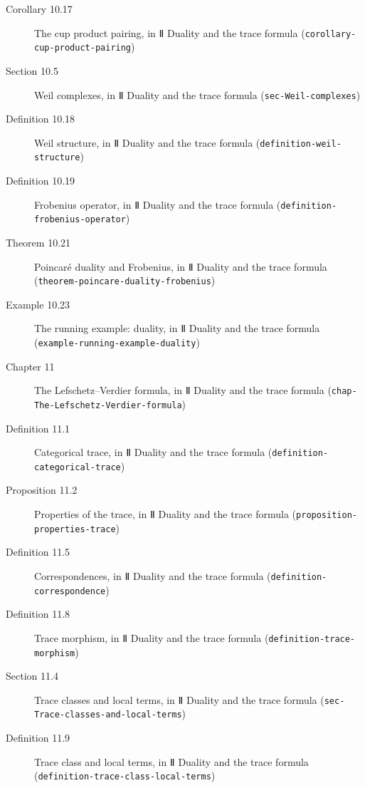 \documentclass[11pt]{article}
\newcommand{\bpslug}[1]{\texttt{#1}}
\begin{document}
\begin{description}
\item[Corollary 10.17] The cup product pairing, in Ⅱ Duality and the trace formula (\bpslug{corollary-{}\allowbreak{}cup-{}\allowbreak{}product-{}\allowbreak{}pairing})
\item[Section 10.5] Weil complexes, in Ⅱ Duality and the trace formula (\bpslug{sec-{}\allowbreak{}Weil-{}\allowbreak{}complexes})
\item[Definition 10.18] Weil structure, in Ⅱ Duality and the trace formula (\bpslug{definition-{}\allowbreak{}weil-{}\allowbreak{}structure})
\item[Definition 10.19] Frobenius operator, in Ⅱ Duality and the trace formula (\bpslug{definition-{}\allowbreak{}frobenius-{}\allowbreak{}operator})
\item[Theorem 10.21] Poincaré duality and Frobenius, in Ⅱ Duality and the trace formula (\bpslug{theorem-{}\allowbreak{}poincare-{}\allowbreak{}duality-{}\allowbreak{}frobenius})
\item[Example 10.23] The running example: duality, in Ⅱ Duality and the trace formula (\bpslug{example-{}\allowbreak{}running-{}\allowbreak{}example-{}\allowbreak{}duality})
\item[Chapter 11] The Lefschetz–Verdier formula, in Ⅱ Duality and the trace formula (\bpslug{chap-{}\allowbreak{}The-{}\allowbreak{}Lefschetz-{}\allowbreak{}Verdier-{}\allowbreak{}formula})
\item[Definition 11.1] Categorical trace, in Ⅱ Duality and the trace formula (\bpslug{definition-{}\allowbreak{}categorical-{}\allowbreak{}trace})
\item[Proposition 11.2] Properties of the trace, in Ⅱ Duality and the trace formula (\bpslug{proposition-{}\allowbreak{}properties-{}\allowbreak{}trace})
\item[Definition 11.5] Correspondences, in Ⅱ Duality and the trace formula (\bpslug{definition-{}\allowbreak{}correspondence})
\item[Definition 11.8] Trace morphism, in Ⅱ Duality and the trace formula (\bpslug{definition-{}\allowbreak{}trace-{}\allowbreak{}morphism})
\item[Section 11.4] Trace classes and local terms, in Ⅱ Duality and the trace formula (\bpslug{sec-{}\allowbreak{}Trace-{}\allowbreak{}classes-{}\allowbreak{}and-{}\allowbreak{}local-{}\allowbreak{}terms})
\item[Definition 11.9] Trace class and local terms, in Ⅱ Duality and the trace formula (\bpslug{definition-{}\allowbreak{}trace-{}\allowbreak{}class-{}\allowbreak{}local-{}\allowbreak{}terms})

\end{description}
\end{document}
